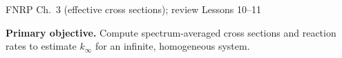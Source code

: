 \providecommand{\dd}{\,\mathrm{d}}
\AtBeginDocument{\setlength{\abovedisplayskip}{4pt plus 1pt minus 1pt}
\setlength{\belowdisplayskip}{4pt plus 1pt minus 1pt}
\setlength{\abovedisplayshortskip}{3pt plus 1pt}
\setlength{\belowdisplayshortskip}{3pt plus 1pt}
\setlength{\jot}{2pt}
}

  {FNRP Ch.~3 (effective cross sections); review Lessons 10--11}

\MakeHandoutTitle
\textcolor{KSUDeepPurple}{\textbf{Primary objective.}}
Compute spectrum-averaged cross sections and reaction rates to estimate
$k_{\infty}$ for an infinite, homogeneous system.
\par\vspace{5pt}

